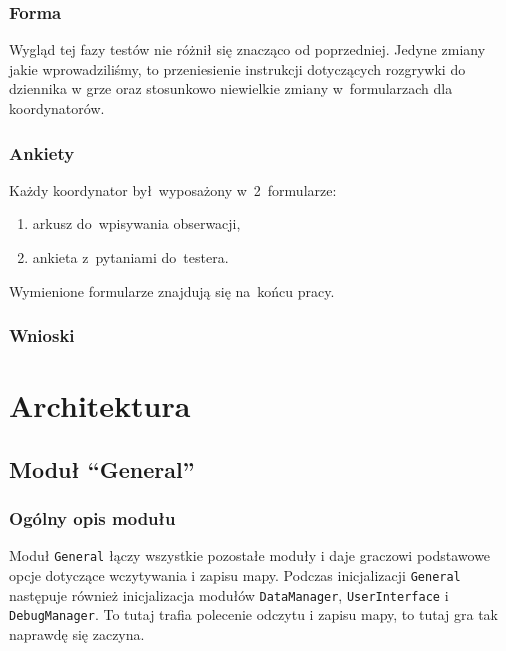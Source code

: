 \documentclass[licencjacka]{pracamgr}
\begin{document}
      \subsection{Forma}
      Wygląd tej fazy testów nie różnił się znacząco od poprzedniej. Jedyne zmiany jakie wprowadziliśmy,
      to przeniesienie instrukcji dotyczących rozgrywki do dziennika w grze oraz stosunkowo niewielkie zmiany
      w~formularzach dla koordynatorów.
    
      \subsection{Ankiety}
      Każdy koordynator był~wyposażony w~2~formularze:
      \begin{enumerate}
	\item arkusz do~wpisywania obserwacji,
	\item ankieta z~pytaniami do~testera.
      \end{enumerate}

      \noindent
      Wymienione formularze znajdują się na~końcu pracy.
      
      \subsection{Wnioski}

\chapter{Architektura}
  \section{Moduł ``General''}
    \subsection{Ogólny opis modułu}
      Moduł \texttt{General} łączy wszystkie pozostałe moduły i daje graczowi podstawowe opcje dotyczące wczytywania i zapisu
      mapy. Podczas inicjalizacji \texttt{General} następuje również inicjalizacja modułów \texttt{DataManager}, \texttt{UserInterface} i
      \texttt{DebugManager}. To tutaj trafia polecenie odczytu i zapisu mapy, to tutaj gra tak naprawdę się zaczyna.
\end{document}
